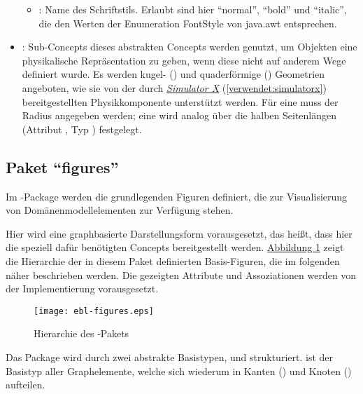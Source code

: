 \documentclass[a4paper,10pt]{sphinxmanual}
\begin{document}
\begin{itemize}
\begin{itemize}
\item {} 
: Name des Schriftstils. Erlaubt sind hier "`normal"', "`bold"' und "`italic"', die den Werten der Enumeration FontStyle von java.awt entsprechen.

\end{itemize}

\item {} 
: Sub-Concepts dieses abstrakten Concepts werden genutzt, um Objekten eine physikalische Repräsentation zu geben, wenn diese nicht auf anderem Wege definiert wurde.
Es werden kugel- () und quaderförmige () Geometrien angeboten, wie sie von der durch {\hyperref[verwendet:simulatorx]{\emph{Simulator X}}} (\autoref*{verwendet:simulatorx}) bereitgestellten Physikkomponente unterstützt werden.
Für eine  muss der Radius angegeben werden; eine  wird analog über die halben Seitenlängen (Attribut , Typ ) festgelegt.

\end{itemize}


\subsection{Paket "`figures"'}
\label{metamodelle:paket-figures}\label{metamodelle:ebl-figures}
Im -Package werden die grundlegenden Figuren definiert, die zur Visualisierung von Domänenmodellelementen zur Verfügung stehen.

Hier wird eine graphbasierte Darstellungsform vorausgesetzt, das heißt, dass hier die speziell dafür benötigten Concepts bereitgestellt werden.
\hyperref[metamodelle:ebl-figures-diag]{Abbildung  \ref*{metamodelle:ebl-figures-diag}} zeigt die Hierarchie der in diesem Paket definierten Basis-Figuren, die im folgenden näher beschrieben werden.
Die gezeigten Attribute und Assoziationen werden von der Implementierung vorausgesetzt.
\begin{figure}[htbp]
\centering
\capstart

\texttt{[image: ebl-figures.eps]}
\caption{Hierarchie des -Pakets}\label{metamodelle:ebl-figures-diag}\end{figure}

Das Package wird durch zwei abstrakte Basistypen,  und  strukturiert.
 ist der Basistyp aller Graphelemente, welche sich wiederum in Kanten () und Knoten () aufteilen.
\end{document}

